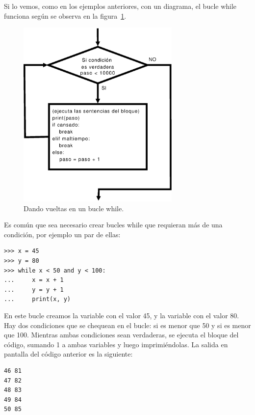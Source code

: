 Si lo vemos, como en los ejemplos anteriores, con un diagrama, el bucle while funciona según se observa en la figura~\ref{while}.

\begin{figure}
\begin{center}
\includegraphics[width=80mm]{while.eps}
\end{center}
\caption{Dando vueltas en un bucle while.}\label{while}
\end{figure}

Es común que sea necesario crear bucles while que requieran más de una condición, por ejemplo un par de ellas:

\begin{listing}
\begin{verbatim}
>>> x = 45
>>> y = 80
>>> while x < 50 and y < 100:
...     x = x + 1
...     y = y + 1
...     print(x, y)
\end{verbatim}
\end{listing}

En este bucle creamos la variable  con el valor 45, y la variable  con el valor 80.  Hay dos condiciones que se chequean en el bucle: si  es menor que 50 y si  es menor que 100. Mientras ambas condiciones sean verdaderas, se ejecuta el bloque del código, sumando 1 a ambas variables y luego imprimiéndolas.  La salida en pantalla del código anterior es la siguiente:

\begin{listing}
\begin{verbatim}
46 81
47 82
48 83
49 84
50 85
\end{verbatim}
\end{listing}

